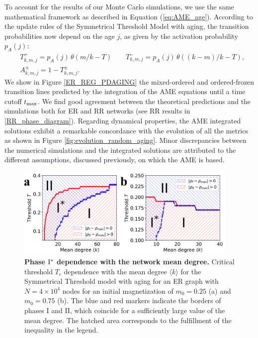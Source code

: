 	To account for the results of our Monte Carlo simulations, we use the same mathematical framework as described in Equation (\ref{eq:AME_age}). According to the update rules of the Symmetrical Threshold Model with aging, the transition probabilities now depend on the age $j$, as given by the activation probability  $p_A (j)$:
	\begin{eqnarray}
		&T^{+}_{k,m,j} = p_A(j) \, \theta(m/k - T) \quad \quad T^{-}_{k,m,j} = p_A(j) \, \theta((k-m)/k - T), \nonumber\\
		&A^{\pm}_{k,m,j} = 1 - T^{\pm}_{k,m,j}.
	\end{eqnarray}
	We show in Figure \ref{ER_REG_PDAGING} the mixed-ordered and ordered-frozen transition lines predicted by the integration of the AME equations until a time cutoff $t_{\rm max}$. We find good agreement between the theoretical predictions and the simulations both for ER and RR networks (see RR results in \ref{RR_phase_diagram}). Regarding dynamical properties, the AME integrated solutions exhibit a remarkable concordance with the evolution of all the metrics as shown in Figure \ref{fig:evolution_random_aging}. Minor discrepancies between the numerical simulations and the integrated solutions are attributed to the different assumptions, discussed previously, on which the AME is based.  
	\begin{figure}[b]
		 \centering
		 \includegraphics[width=0.95\textwidth]{Figs/Aging_STM/FIG8.pdf}
		 \caption{\label{fig:PD_Z} \textbf{Phase ${\rm I}^{*}$ dependence with the network mean degree.} Critical threshold $T_c$ dependence with the mean degree $\langle k \rangle$ for the Symmetrical Threshold model with aging for an ER graph with $N = 4 \times 10^4$ nodes for an initial magnetization of $m_0 = 0.25$ (a) and $m_0 = 0.75$ (b). The blue and red markers indicate the borders of phases I and II, which coincide for a sufficiently large value of the mean degree. The hatched area corresponds to the fulfillment of the inequality in the legend.}
	\end{figure}
	
